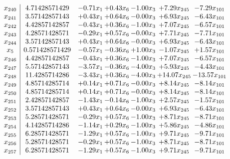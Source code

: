 \documentclass[8pt]{article}
\begin{document}
\[\begin{array}{c| c c@{\hskip 2pt} c@{\hskip 2pt} c@{\hskip 2pt} c@{\hskip 2pt} c@{\hskip 2pt} }
 x_{240}   &  4.71428571429 & -0.71 x_{1} & +  0.43 x_{6} & -1.00 x_{3} & +  7.29 x_{245} & -7.29 x_{101}\\
 x_{241}   &  3.57142857143 & +  0.43 x_{1} & +  0.64 x_{6} & -0.00 x_{3} & +  6.93 x_{245} & -6.43 x_{101}\\
 x_{242}   &  4.42857142857 & -0.43 x_{1} & +  0.36 x_{6} & -1.00 x_{3} & +  7.07 x_{245} & -6.57 x_{101}\\
 x_{243}   &  4.28571428571 & -0.29 x_{1} & +  0.57 x_{6} & -0.00 x_{3} & +  7.71 x_{245} & -7.71 x_{101}\\
 x_{244}   &  3.57142857143 & +  0.43 x_{1} & +  0.64 x_{6} & -0.00 x_{3} & +  6.93 x_{245} & -6.43 x_{101}\\
 x_{5}   &  0.571428571429 & -0.57 x_{1} & -0.36 x_{6} & +  1.00 x_{3} & -1.07 x_{245} & +  1.57 x_{101}\\
 x_{246}   &  4.42857142857 & -0.43 x_{1} & +  0.36 x_{6} & -1.00 x_{3} & +  7.07 x_{245} & -6.57 x_{101}\\
 x_{247}   &  5.57142857143 & -3.57 x_{1} & -0.36 x_{6} & -4.00 x_{3} & +  5.93 x_{245} & -4.43 x_{101}\\
 x_{248}   &  11.4285714286 & -3.43 x_{1} & +  0.36 x_{6} & -4.00 x_{3} & + 14.07 x_{245} & -13.57 x_{101}\\
 x_{249}   &  4.85714285714 & +  0.14 x_{1} & +  0.71 x_{6} & -0.00 x_{3} & +  8.14 x_{245} & -8.14 x_{101}\\
 x_{250}   &  4.85714285714 & +  0.14 x_{1} & +  0.71 x_{6} & -0.00 x_{3} & +  8.14 x_{245} & -8.14 x_{101}\\
 x_{251}   &  2.42857142857 & -1.43 x_{1} & -0.14 x_{6} & -1.00 x_{3} & +  2.57 x_{245} & -1.57 x_{101}\\
 x_{252}   &  3.57142857143 & +  0.43 x_{1} & +  0.64 x_{6} & -0.00 x_{3} & +  6.93 x_{245} & -6.43 x_{101}\\
 x_{253}   &  5.28571428571 & -0.29 x_{1} & +  0.57 x_{6} & -1.00 x_{3} & +  8.71 x_{245} & -8.71 x_{101}\\
 x_{254}   &  4.14285714286 & -1.14 x_{1} & +  0.29 x_{6} & -1.00 x_{3} & +  5.86 x_{245} & -4.86 x_{101}\\
 x_{255}   &  6.28571428571 & -1.29 x_{1} & +  0.57 x_{6} & -1.00 x_{3} & +  9.71 x_{245} & -9.71 x_{101}\\
 x_{256}   &  5.28571428571 & -0.29 x_{1} & +  0.57 x_{6} & -1.00 x_{3} & +  8.71 x_{245} & -8.71 x_{101}\\
 x_{257}   &  6.28571428571 & -1.29 x_{1} & +  0.57 x_{6} & -1.00 x_{3} & +  9.71 x_{245} & -9.71 x_{101}\\

\end{array}\]
\end{document}
